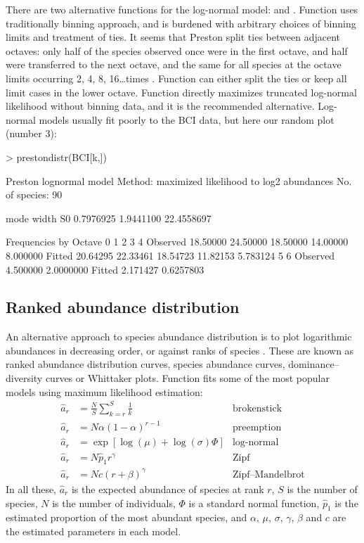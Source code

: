 \documentclass[a4paper,10pt,twocolumn]{article}
\begin{document}
There are two alternative functions for the log-normal model:
 and .  Function 
uses traditionally binning approach, and is burdened with arbitrary
choices of binning limits and treatment of ties. It seems that Preston
split ties between adjacent octaves: only half of the species observed
once were in the first octave, and half were transferred to the next
octave, and the same for all species at the octave limits occurring 2,
4, 8, 16\ldots times \citep{WilliamsonGaston05}. Function
 can either split the ties or keep all limit cases in
the lower octave.  Function  directly maximizes
truncated log-normal likelihood without binning data, and it is the
recommended alternative.  Log-normal models usually fit poorly to the
BCI data, but here our random plot (number 3):
\begin{Schunk}
\begin{Sinput}
> prestondistr(BCI[k,])
\end{Sinput}
\begin{Soutput}
Preston lognormal model
Method: maximized likelihood to log2 abundances 
No. of species: 90 

      mode      width         S0 
 0.7976925  1.9441100 22.4558697 

Frequencies by Octave
                0        1        2        3        4
Observed 18.50000 24.50000 18.50000 14.00000 8.000000
Fitted   20.64295 22.33461 18.54723 11.82153 5.783124
                5         6
Observed 4.500000 2.0000000
Fitted   2.171427 0.6257803
\end{Soutput}
\end{Schunk}

\subsection{Ranked abundance distribution}

An alternative approach to species abundance distribution is to plot
logarithmic abundances in decreasing order, or against ranks of
species \citep{Whittaker65}.  These are known as ranked abundance
distribution curves, species abundance curves, dominance--diversity
curves or Whittaker plots.  Function  fits some of the
most popular models \citep{Bastow91} using maximum likelihood
estimation:
\begin{align}
\hat a_r &= \frac{N}{S} \sum_{k=r}^S \frac{1}{k} &\text{brokenstick}\\
\hat a_r &= N \alpha (1-\alpha)^{r-1} & \text{preemption} \\
\hat a_r &= \exp \left[\log (\mu) + \log (\sigma) \Phi \right]
&\text{log-normal}\\
\hat a_r &= N \hat p_1 r^\gamma &\text{Zipf}\\
\hat a_r &= N c (r + \beta)^\gamma &\text{Zipf--Mandelbrot}
\end{align}
In all these, $\hat a_r$ is the expected abundance of species at rank $r$, $S$
is the number of species, $N$ is the number of individuals, $\Phi$ is
a standard normal function, $\hat p_1$ is the estimated proportion of
the most abundant species, and $\alpha$, $\mu$, $\sigma$, $\gamma$,
$\beta$ and $c$ are the estimated parameters in each model.
\end{document}

